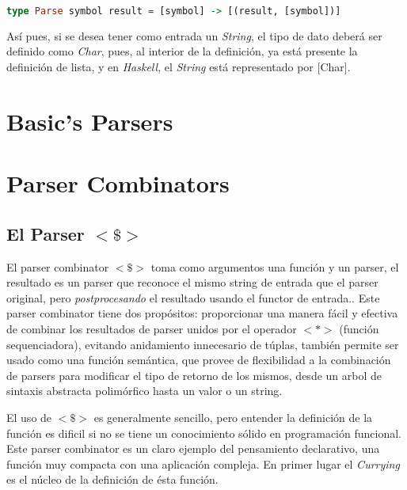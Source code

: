 \begin{lstlisting}[language=Haskell]
type Parse symbol result = [symbol] -> [(result, [symbol])]
\end{lstlisting}

Así pues, si se desea tener como entrada un \emph{String}, el tipo de dato deberá ser definido como \emph{Char}, pues, al interior de la definición, ya está presente la definición de lista, y en \emph{Haskell}, el \emph{String} está representado por [Char].

\section{Basic's Parsers}

\section{Parser Combinators}

\subsection{El Parser $<\$>$}
El parser combinator $<\$>$ toma como argumentos una función y un parser, el resultado es un parser que reconoce el mismo string de entrada que el parser original, pero \emph{postprocesando} el resultado usando el functor de entrada.\cite{Jeuring2010}. Este parser combinator tiene dos propósitos: proporcionar una manera fácil y efectiva de combinar los resultados de parser unidos por el operador $<*>$ (función sequenciadora), evitando anidamiento innecesario de túplas, también permite ser usado como una función semántica, que provee de flexibilidad a la combinación de parsers para modificar el tipo de retorno de los mismos, desde un arbol de sintaxis abstracta polimórfico hasta un valor o un string. 

El uso de $<\$>$ es generalmente sencillo, pero entender la definición de la función es dificil si no se tiene un conocimiento sólido en programación funcional. Este parser combinator es un claro ejemplo del pensamiento declarativo, una función muy compacta con una aplicación compleja. En primer lugar el \emph{Currying} es el núcleo de la definición de ésta función.

